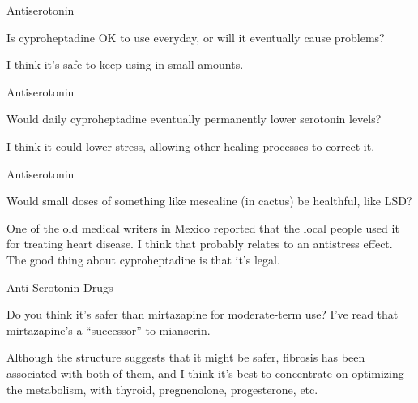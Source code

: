 \documentclass[11pt,oneside,openany,extrafontsizes]{memoir}
\begin{document}
\begin{qaexchange}{Antiserotonin}

    \begin{question}
        Is cyproheptadine OK to use everyday, or will it eventually cause problems?
    \end{question}

    \begin{answer}
      I think it's safe to keep using in small amounts.
    \end{answer}
\end{qaexchange}

\begin{qaexchange}{Antiserotonin}

    \begin{question}
        Would daily cyproheptadine eventually permanently lower serotonin levels?
    \end{question}

    \begin{answer}
      I think it could lower stress, allowing other healing processes to correct it.
    \end{answer}
\end{qaexchange}

\begin{qaexchange}{Antiserotonin}

    \begin{question}
        Would small doses of something like mescaline (in cactus) be healthful, like LSD?
    \end{question}

    \begin{answer}
      One of the old medical writers in Mexico reported that the local people used it for treating heart disease. I think that probably relates to an antistress effect. The good thing about cyproheptadine is that it's legal.
    \end{answer}
\end{qaexchange}

\begin{qaexchange}{Anti-Serotonin Drugs}

    \begin{question}
         Do you think it's safer than mirtazapine for moderate-term use? I've read that mirtazapine's a \enquote{successor} to mianserin.
    \end{question}

    \begin{answer}
      Although the structure suggests that it might be safer, fibrosis has been associated with both of them, and I think it's best to concentrate on optimizing the metabolism, with thyroid, pregnenolone, progesterone, etc.
    \end{answer}
\end{qaexchange}
\end{document}
